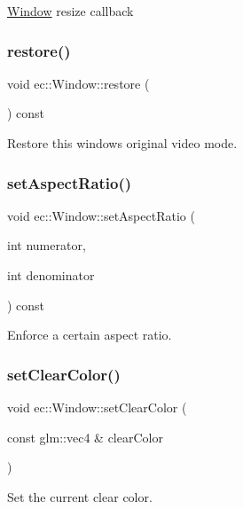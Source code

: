 \mbox{\hyperlink{classec_1_1_window}{Window}} resize callback \mbox{\label{classec_1_1_window_a30b3a1e8d3b0f8ae82ee9e4e0235f174}} 
\subsubsection{\texorpdfstring{restore()}{restore()}}
{\footnotesize\ttfamily void ec\+::\+Window\+::restore (\begin{DoxyParamCaption}{ }\end{DoxyParamCaption}) const}

Restore this windows original video mode. \mbox{\label{classec_1_1_window_abe49e52c64cce2e71ba17f25521d00eb}} 
\subsubsection{\texorpdfstring{set\+Aspect\+Ratio()}{setAspectRatio()}}
{\footnotesize\ttfamily void ec\+::\+Window\+::set\+Aspect\+Ratio (\begin{DoxyParamCaption}\item[{int}]{numerator,  }\item[{int}]{denominator }\end{DoxyParamCaption}) const}

Enforce a certain aspect ratio. \mbox{\label{classec_1_1_window_a915c4b64dde5f2274e59c40bc10eff58}} 
\subsubsection{\texorpdfstring{set\+Clear\+Color()}{setClearColor()}}
{\footnotesize\ttfamily void ec\+::\+Window\+::set\+Clear\+Color (\begin{DoxyParamCaption}\item[{const glm\+::vec4 \&}]{clear\+Color }\end{DoxyParamCaption})}

Set the current clear color. \mbox{\label{classec_1_1_window_a2285600c974d0a2381f84cef3899822f}} 

